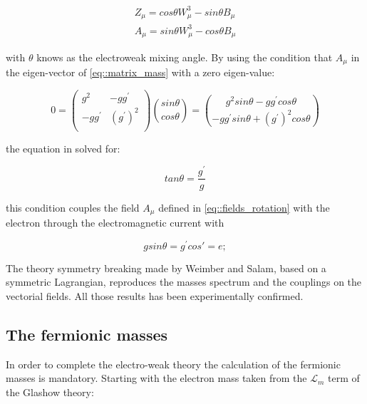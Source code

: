 \begin{equation}
\begin{array}{c}
Z_{\mu} = cos\theta W^{3}_{\mu} - sin\theta B_{\mu}\\
A_{\mu} = sin\theta W^{3}_{\mu} - cos\theta B_{\mu}

\end{array}
\label{eq::fields_rotation}
\end{equation}

with $\theta$ knows as the electroweak mixing angle. By using the condition that $A_{\mu}$ in the eigen-vector of \ref{eq::matrix_mass} with a zero eigen-value:

\begin{equation}
0 = 
\begin{pmatrix}
g^{2} & -gg^{\prime} \\
-gg^{\prime} & (g^{\prime})^{2} \\
\end{pmatrix}
\binom{sin\theta}{cos\theta}
=
\binom{g^{2} sin\theta - gg^{\prime}cos\theta}{-gg^{\prime}sin\theta + (g^{\prime})^{2}cos\theta}
\label{eq::matrix_rotation}
\end{equation}

the equation in solved for:

\begin{equation}
tan\theta = \dfrac{g^{\prime}}{g}
\label{eq::matrix_solution}
\end{equation}

this condition couples the field $A_{\mu}$ defined in \ref{eq::fields_rotation} with the electron through the electromagnetic current with

\begin{equation}
gsin\theta = g^{\prime} cos\prime = e; 
\end{equation}

The theory symmetry breaking made by Weimber and Salam, based on a symmetric Lagrangian, reproduces the masses spectrum and the couplings on the vectorial fields. All those results has been experimentally confirmed.

\subsection{The fermionic masses}

In order to complete the electro-weak theory the calculation of the fermionic masses is mandatory. Starting with the electron mass taken from the $\mathcal{L}_{m}$ term of the Glashow theory:

